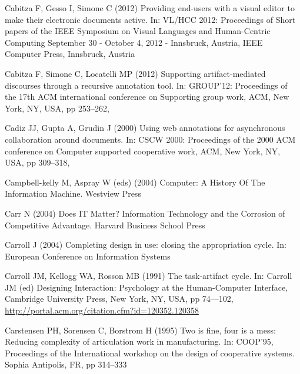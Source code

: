 \documentclass{article}
\begin{document}
\begin{thebibliography}{193}
Cabitza F, Gesso I, Simone C (2012{}) Providing end-users with a
  visual editor to make their electronic documents active. In: {VL/HCC} 2012:
  Proceedings of Short papers of the {IEEE} Symposium on Visual Languages and
  Human-Centric Computing September 30 - October 4, 2012 - Innsbruck, Austria,
  {IEEE} Computer Press, Innsbruck, Austria

Cabitza F, Simone C, Locatelli MP (2012{}) Supporting
  artifact-mediated discourses through a recursive annotation tool. In:
  {GROUP'12:} Proceedings of the 17th {ACM} international conference on
  Supporting group work, {ACM}, New York, {NY}, {USA}, pp 253--262,

Cadiz JJ, Gupta A, Grudin J (2000) Using web annotations for asynchronous
  collaboration around documents. In: {CSCW} 2000: Proceedings of the 2000
  {ACM} conference on Computer supported cooperative work, {ACM}, New York,
  {NY}, {USA}, pp 309--318, 

Campbell-kelly M, Aspray W (eds)  (2004) Computer: A History Of The Information
  Machine. Westview Press

Carr N (2004) Does {IT} Matter? Information Technology and the Corrosion of
  Competitive Advantage. Harvard Business School Press

Carroll J (2004) Completing design in use: closing the appropriation cycle. In:
  European Conference on Information Systems

Carroll JM, Kellogg WA, Rosson MB (1991) The task-artifact cycle. In: Carroll
  JM (ed) Designing Interaction: Psychology at the Human-Computer Interface,
  Cambridge University Press, New York, {NY}, {USA}, pp 74---102,
  \urlprefix\url{http://portal.acm.org/citation.cfm?id=120352.120358}

Carstensen PH, Sorensen C, Borstrom H (1995) Two is fine, four is a mess:
  Reducing complexity of articulation work in manufacturing. In: {COOP'95},
  Proceedings of the International workshop on the design of cooperative
  systems. Sophia Antipolis, {FR}, pp 314--333


\end{thebibliography}
\end{document}
